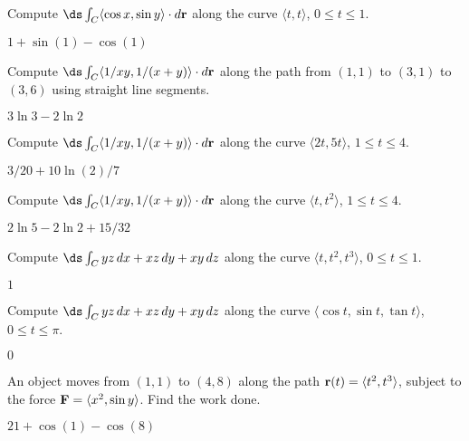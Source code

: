 \begin{exercises}
\begin{exercise} Compute $\ds\int_C \langle \cos x,\sin y\rangle\cdot 
d{\bf r}$ along the 
curve $\langle t,t\rangle$, $0\le t\le1$.
\begin{answer} $1+\sin(1)-\cos(1)$
\end{answer}\end{exercise}

\begin{exercise} Compute $\ds\int_C \langle 1/xy,1/(x+y)\rangle\cdot
d{\bf r}$ along the 
path from $(1,1)$ to $(3,1)$ to $(3,6)$ using straight line segments.
\begin{answer} $3\ln3-2\ln2$
\end{answer}\end{exercise}

\begin{exercise} Compute $\ds\int_C \langle 1/xy,1/(x+y)\rangle\cdot
d{\bf r}$ along the 
curve $\langle 2t,5t\rangle$, $1\le t\le 4$.
\begin{answer} $3/20+10\ln(2)/7$
\end{answer}\end{exercise}

\begin{exercise} Compute $\ds\int_C \langle 1/xy,1/(x+y)\rangle\cdot 
d{\bf r}$ along the 
curve $\langle t,t^2\rangle$, $1\le t\le 4$.
\begin{answer} $2\ln5-2\ln2+15/32$
\end{answer}\end{exercise}

\begin{exercise} Compute $\ds\int_C yz\,dx+xz\,dy+xy\,dz$ along the curve
$\langle t,t^2,t^3\rangle$, $0\le t\le1$.
\begin{answer} $1$
\end{answer}\end{exercise}

\begin{exercise} Compute $\ds\int_C yz\,dx+xz\,dy+xy\,dz$ along the curve
$\langle \cos t,\sin t,\tan t\rangle$, $0\le t\le\pi$.
\begin{answer} $0$
\end{answer}\end{exercise}

\begin{exercise} An object moves from $(1,1)$ to
$(4,8)$ along the path ${\bf r}(t)=\langle t^2,t^3\rangle$,
subject to the force ${\bf F}=\langle x^2,\sin y\rangle$. Find the work
done. 
\begin{answer} $21+\cos(1)-\cos(8)$
\end{answer}\end{exercise}


\end{exercises}
